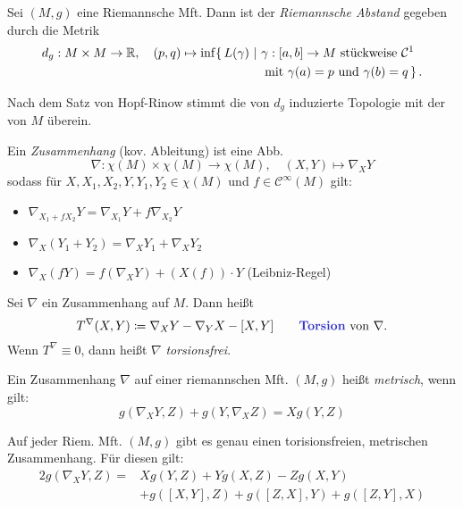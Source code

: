 \documentclass{cheat-sheet}
\newcommand{\abinterval}{\cinterval{a}{b}} %
\begin{document}
\begin{defn}
  Sei $(M, g)$ eine Riemannsche Mft. Dann ist der \emph{Riemannsche Abstand} gegeben durch die Metrik
  \begin{align*}
    d_g : M \times M \to \R, \quad
    (p, q) \mapsto \inf \{\, L(\gamma) \,\,|\,\, & \gamma : \abinterval \to M \text{ stückweise } \mathcal{C}^{1}\\
    & \left. \text{mit $\gamma(a) = p$ und $\gamma(b) = q$} \, \right\}.
  \end{align*}
\end{defn}

\begin{bem}
  Nach dem Satz von Hopf-Rinow stimmt die von $d_g$ induzierte Topologie mit der von $M$ überein.
\end{bem}


\begin{defn}
  Ein \emph{Zusammenhang} (kov. Ableitung) ist eine Abb.
  \[
    \nabla : \chi(M) \times \chi(M) \to \chi(M), \quad
    (X, Y) \mapsto \nabla_X Y
  \]
  sodass für $X, X_1, X_2, Y, Y_1, Y_2 \in \chi(M)$ und $f \in \mathcal{C}^\infty(M)$ gilt:
  \begin{itemize}
    \item $\nabla_{X_1 + f X_2} Y = \nabla_{X_1} Y + f \nabla_{X_2} Y$
    \item $\nabla_X (Y_1 + Y_2) = \nabla_X Y_1 + \nabla_X Y_2$
    \item $\nabla_X (f Y) = f \left( \nabla_X Y \right) + (X(f)) \cdot Y$ \enspace (Leibniz-Regel)
  \end{itemize}
\end{defn}

\begin{defn}
  Sei $\nabla$ ein Zusammenhang auf $M$. Dann heißt
  \[
    T^\nabla(X, Y) \coloneqq \nabla_X Y - \nabla_Y X - [X, Y]
    \qquad \text{\emph{Torsion} von $\nabla$.}
  \]
  Wenn $T^\nabla \equiv 0$, dann heißt $\nabla$ \emph{torsionsfrei}.
\end{defn}

\begin{defn}
  Ein Zusammenhang $\nabla$ auf einer riemannschen Mft. $(M, g)$ heißt \emph{metrisch}, wenn gilt:
  \[ g(\nabla_X Y, Z) + g(Y, \nabla_X Z) = X g(Y, Z) \]
\end{defn}

\begin{thm}
  Auf jeder Riem. Mft. $(M, g)$ gibt es genau einen torisionsfreien, metrischen Zusammenhang. Für diesen gilt:
  \begin{align*}
    2 g(\nabla_X Y, Z) = & X g(Y, Z) + Y g(X, Z) - Z g(X, Y)\\
    & + g([X, Y], Z) + g([Z, X], Y) + g([Z, Y], X)
  \end{align*}
\end{thm}
\end{document}
